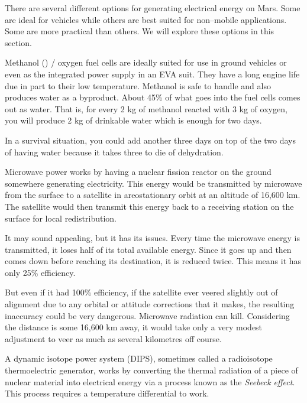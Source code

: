 

There are several different options for generating electrical energy on Mars. Some are ideal for vehicles while others are best suited for non--mobile applications. Some are more practical than others. We will explore these options in this section.

Methanol () / oxygen fuel cells are ideally suited for use in ground vehicles or even as the integrated power supply in an EVA suit. They have a long engine life due in part to their low temperature. Methanol is safe to handle and also produces water as a byproduct. About 45\% of what goes into the fuel cells comes out as water. That is, for every 2 kg of methanol reacted with 3 kg of oxygen, you will produce 2 kg of drinkable water which is enough for two days. 

In a survival situation, you could add another three days on top of the two days of having water because it takes three to die of dehydration.


Microwave power works by having a nuclear fission reactor on the ground somewhere generating electricity. This energy would be transmitted by microwave from the surface to a satellite in areostationary orbit at an altitude of 16,600 km. The satellite would then transmit this energy back to a receiving station on the surface for local redistribution.

It may sound appealing, but it has its issues. Every time the microwave energy is transmitted, it loses half of its total available energy. Since it goes up and then comes down before reaching its destination, it is reduced twice. This means it has only 25\% efficiency.

But even if it had 100\% efficiency, if the satellite ever veered slightly out of alignment due to any orbital or attitude corrections that it makes, the resulting inaccuracy could be very dangerous. Microwave radiation can kill. Considering the distance is some 16,600 km away, it would take only a very modest adjustment to veer as much as several kilometres off course.

A dynamic isotope power system (DIPS), sometimes called a radioisotope thermoelectric generator, works by converting the thermal radiation of a piece of nuclear material into electrical energy via a process known as the {\it Seebeck effect}. This process requires a temperature differential to work.


